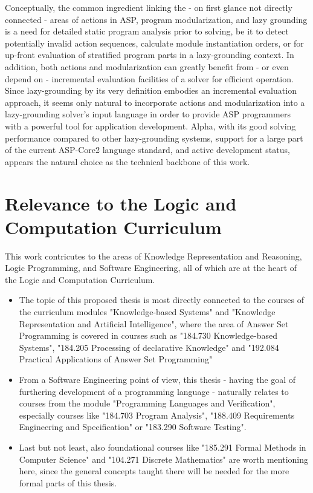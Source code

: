 \documentclass[12pt, letterpaper, twoside]{scrartcl}
\begin{document}
Conceptually, the common ingredient linking the - on first glance not directly connected - areas of actions in ASP, program modularization, and lazy grounding is a need for detailed static program analysis prior to solving, be it to detect potentially invalid action sequences, calculate module instantiation orders, or for up-front evaluation of stratified program parts in a lazy-grounding context. In addition, both actions and modularization can greatly benefit from - or even depend on - incremental evaluation facilities of a solver for efficient operation. Since lazy-grounding by its very definition embodies an incremental evaluation approach, it seems only natural to incorporate actions and modularization into a lazy-grounding solver's input language in order to provide ASP programmers with a powerful tool for application development. Alpha, with its good solving performance compared to other lazy-grounding systems, support for a large part of the current ASP-Core2 language standard, and active development status, appears the natural choice as the technical backbone of this work.

\section{Relevance to the Logic and Computation Curriculum}

This work contricutes to the areas of Knowledge Representation and Reasoning, Logic Programming, and Software Engineering, all of which are at the heart of the Logic and Computation Curriculum.
\begin{itemize}
	\item The topic of this proposed thesis is most directly connected to the courses of the curriculum modules "Knowledge-based Systems" and "Knowledge Representation and Artificial Intelligence", where the area of Answer Set Programming is covered in courses such as "184.730 Knowledge-based Systems", "184.205 Processing of declarative Knowledge" and "192.084 Practical Applications of Answer Set Programming"
	\item From a Software Engineering point of view, this thesis - having the goal of furthering development of a programming language - naturally relates to courses from the module "Programming Languages and Verification", especially courses like "184.703 Program Analysis", "188.409 Requirements Engineering and Specification" or "183.290 Software Testing".
	\item Last but not least, also foundational courses like "185.291 Formal Methods in Computer Science" and "104.271 Discrete Mathematics" are worth mentioning here, since the general concepts taught there will be needed for the more formal parts of this thesis.
\end{itemize}




\end{document}
